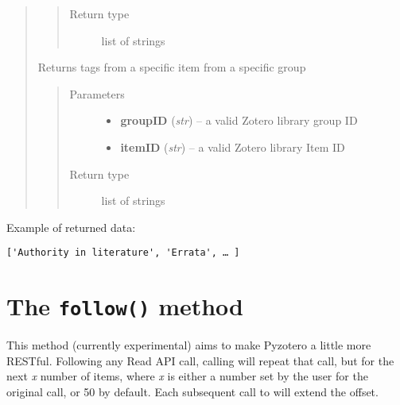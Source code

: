 \documentclass[letterpaper,10pt,english]{sphinxmanual}
\begin{document}
\begin{quote}
\begin{fulllineitems}
\begin{quote}
\begin{description}
\item[{Return type}] \leavevmode
list of strings

\end{description}\end{quote}

\end{fulllineitems}


\begin{fulllineitems}
\label{index:pyzotero.zotero.Zotero.group_item_tags}
Returns tags from a specific item from a specific group
\begin{quote}\begin{description}
\item[{Parameters}] \leavevmode\begin{itemize}
\item {} 
\textbf{groupID} (\emph{str}) -- a valid Zotero library group ID

\item {} 
\textbf{itemID} (\emph{str}) -- a valid Zotero library Item ID

\end{itemize}

\item[{Return type}] \leavevmode
list of strings

\end{description}\end{quote}

\end{fulllineitems}

\end{quote}

Example of returned data:

\begin{Verbatim}[commandchars=\\\{\}]
['Authority in literature', 'Errata', … ]
\end{Verbatim}


\section{The \texttt{follow()} method}
\label{index:the-follow-method}
This method (currently experimental) aims to make Pyzotero a little more RESTful. Following any Read API call, calling  will repeat that call, but for the next \emph{x} number of items, where \emph{x} is either a number set by the user for the original call, or 50 by default. Each subsequent call to  will extend the offset.
\end{document}
